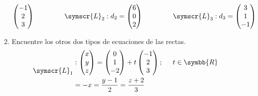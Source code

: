 \documentclass{article}
\def\fancyL{\symscr{L}}
\def\realR{\symbb{R}}
\begin{document}
\begin{enumerate}
\begin{enumerate}[label=\listAlph]
\[\begin{pmatrix}
                    -1 \\ 2 \\ 3
                \end{pmatrix}
                \hspace{1.5cm}
                \fancyL_2:
                d_2 =
                \begin{pmatrix}
                    6 \\ 0 \\ 2
                \end{pmatrix}
                \hspace{1.5cm}
                \fancyL_3:
                d_3 =
                \begin{pmatrix}
                    3 \\ 1 \\ -1
                \end{pmatrix}
            \]
		\item Encuentre los otros dos tipos de ecuaciones de las rectas.
            \[
                \begin{aligned}
                    &\fancyL_1
                    \begin{aligned}
                        &:\begin{pmatrix}
                            x \\ y \\ z
                        \end{pmatrix} 
                        = 
                        \begin{pmatrix}
                            0 \\ 1 \\ -2
                        \end{pmatrix}
                        +
                        t\begin{pmatrix}
                            -1 \\ 2 \\ 3
                        \end{pmatrix};
                        \hspace{0.5cm}
                        t \in \realR
                        \\
                        &=
                        -x
                        =
                        \frac{y - 1}{2}
                        =
                        \frac{z + 2}{3}
                    \end{aligned}
                    \\[0.5cm]

\end{aligned}\]
\end{enumerate}
\end{enumerate}
\end{document}
